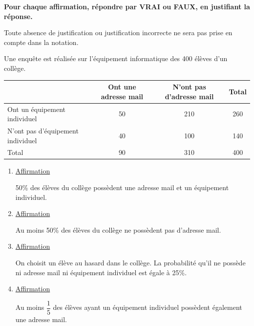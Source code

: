 \par
\textbf{Pour chaque affirmation, répondre par VRAI ou FAUX, en justifiant la réponse.}\par
Toute absence de justification ou justification incorrecte ne sera pas prise en compte dans la notation.

Une enquête est réalisée sur l'équipement informatique des 400 élèves d'un collège.
\begin{center}\renewcommand{\arraystretch}{1.35}
\begin{tabular}{|p{3.2cm}|c|c|c|}\hline
& Ont une adresse mail & N'ont pas d'adresse mail & Total\\\hline
Ont un équipement individuel & 50 & 210 & 260\\\hline
N'ont pas d'équipement individuel & 40 & 100 & 140\\\hline
Total & 90 & 310 & 400\\\hline
\end{tabular}
\end{center}

\begin{enumerate}
\item \underline{Affirmation}

50\% des élèves du collège possèdent une adresse mail et un équipement individuel.

\item \underline{Affirmation}

Au moins 50\% des élèves du collège ne possèdent pas d'adresse mail.

\item \underline{Affirmation}

On choisit un élève au hasard dans le collège. La probabilité qu'il ne possède ni adresse mail ni équipement individuel est égale à 25\%.

\item \underline{Affirmation}

Au moins $\dfrac{1}{5}$ des élèves ayant un équipement individuel possèdent également une adresse mail.
\end{enumerate}

